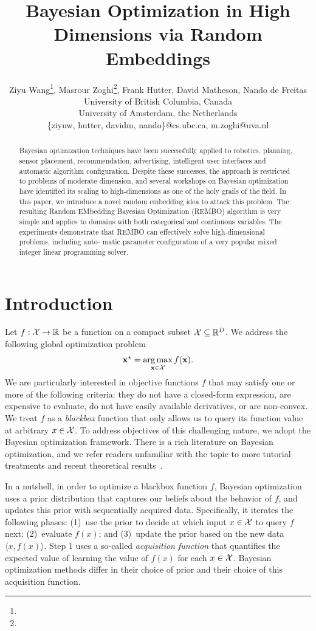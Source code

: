 \documentclass{article}
\title{Bayesian Optimization in High Dimensions via Random Embeddings}
\author{Ziyu Wang\footnote{},
Masrour Zoghi\footnote{},
Frank Hutter\samethanks[1],
David Matheson\samethanks[1],
Nando de Freitas\samethanks[1]\\
\samethanks[1]University of British Columbia, Canada \\
\samethanks[2]University of Amsterdam, the Netherlands\\
\samethanks[1]\{ziyuw, hutter, davidm, nando\}@cs.ubc.ca, \samethanks[2]m.zoghi@uva.nl}
\DeclareMathOperator*{\argmax}{arg\,max}
\begin{document}
\maketitle

\begin{abstract}
  Bayesian optimization techniques have been successfully applied to robotics, planning, sensor placement, recommendation, advertising, intelligent user interfaces and automatic algorithm configuration. Despite these successes, the approach is restricted to problems of moderate dimension, and several 
workshops on Bayesian optimization have identified its scaling to high-dimensions as one of the holy grails of the field. 
In this paper, we introduce a novel random embedding idea to attack this problem.
The resulting Random EMbedding Bayesian Optimization (REMBO) algorithm is very simple
and applies to domains with both categorical and continuous variables. 
The experiments demonstrate that REMBO can effectively solve high-dimensional problems, including auto-
matic parameter configuration of a very popular
mixed integer linear programming solver.

\end{abstract}




\section{Introduction}
\label{sec:introduction}
Let $f: {\cal X} \to \mathbb{R}$ be a function on a compact subset ${\cal X} \subseteq \mathbb{R}^D$. We address the following global optimization problem
\[ \vx^{\star} = \argmax_{\vx \in {\cal X}} f(\vx). \]
We are particularly interested in objective functions $f$ that may satisfy one or more of the following criteria: they do not have a closed-form expression, are expensive to evaluate, do not have easily available derivatives, or are non-convex. We treat $f$ as a \emph{blackbox} function that only allows us to query its function value at arbitrary $x\in \cal{X}$.
To address objectives of this challenging nature, we adopt the Bayesian optimization framework. 
There is a rich literature on Bayesian optimization, and we refer readers unfamiliar with the topic to more tutorial treatments \cite{Brochu:2009,Jones:1998,Jones:2001,Lizotte:2011,Mockus:1994,Osborne:2009} and recent theoretical results~\cite{Srinivas:2010,deFreitas:2012}. 

In a nutshell, in order to optimize a blackbox function $f$, Bayesian optimization uses a prior distribution that captures our beliefs about the behavior of $f$,
and updates this prior with sequentially acquired data.
Specifically, it iterates the following phases:
(1)~use the prior to decide at which input $x\in \cal X$ to query $f$ next; 
(2)~evaluate $f(x)$; and (3)~update the prior based on the new data $\langle{}x, f(x)\rangle$.
Step 1 uses a so-called \emph{acquisition function} that quantifies the expected value of learning the value of $f(x)$ for each $x \in \cal X$.
Bayesian optimization methods differ in their choice of prior and their choice of this acquisition function.
\end{document}
